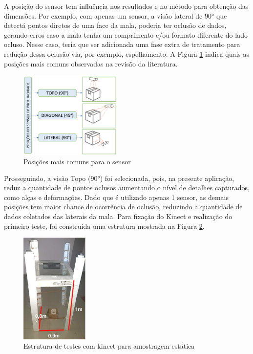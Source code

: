     A posição do sensor tem influência nos resultados e no método para obtenção das dimensões. Por exemplo, com apenas um sensor, a visão lateral de 90° que detectá pontos diretos de uma face da mala, poderia ter oclusão de dados, gerando erros caso a mala tenha um comprimento e/ou formato diferente do lado ocluso. Nesse caso, teria que ser adicionada uma fase extra de tratamento para redução dessa oclusão via, por exemplo, espelhamento. A Figura \ref{fig:posicoesSensorProfundidade} indica quais as posições mais comuns observadas na revisão da literatura. 
    
        \begin{figure}[h]
           \centering
           \includegraphics[width=0.45\textwidth]{imagens/posições do sensor de profundidade.png} 
           \caption{Posições mais comuns para o sensor}
           \label{fig:posicoesSensorProfundidade}
        \end{figure}

    Prosseguindo, a visão Topo (90°) foi selecionada, pois, na presente aplicação, reduz a quantidade de pontos oclusos aumentando o nível de detalhes capturados, como alças e deformações. Dado que é utilizado apenas 1 sensor, as demais posições tem maior chance de ocorrência de oclusão, reduzindo a quantidade de dados coletados das laterais da mala. Para fixação do Kinect e realização do primeiro teste, foi construída uma estrutura mostrada na Figura \ref{fig:Estrutura para testes com kinect}.

        \begin{figure}[h]
           \centering
           \includegraphics[width=0.3\textwidth]{imagens/EstruturaDeFixacaoKinectSemEsteira.png} 
           \caption{Estrutura de testes com kinect para amostragem estática}
          \label{fig:Estrutura para testes com kinect}
        \end{figure}
    
